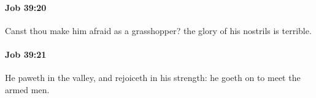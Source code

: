 		\paragraph{Job 39:20} %
			\label{JOB-39-20}

			Canst thou make him afraid as a grasshopper? the glory of his nostrils is terrible.


		\paragraph{Job 39:21} %
			\label{JOB-39-21}

			He paweth in the valley, and rejoiceth in his strength: he goeth on to meet the armed men.


